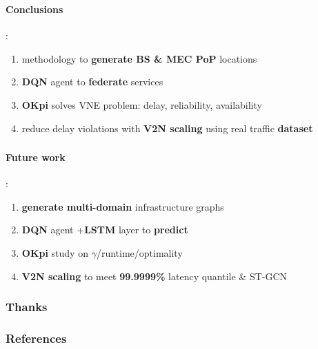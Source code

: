 \documentclass[aspectratio=169]{beamer}
\begin{document}
\begin{frame}
    \frametitle{\secname}
    \framesubtitle{Conclusions}:
    \begin{enumerate}
        \item methodology to \textbf{generate BS \& MEC PoP} locations\pause
        \item \textbf{DQN} agent to \textbf{federate} services\pause
        \item \textbf{OKpi} solves VNE problem: delay, reliability, availability\pause
        \item reduce delay violations with \textbf{V2N scaling} using real traffic \textbf{dataset}
    \end{enumerate}
\end{frame}


\begin{frame}
    \frametitle{\secname}
    \framesubtitle{Future work}:
    \begin{enumerate}
        \item \textbf{generate multi-domain} infrastructure graphs\pause
        \item \textbf{DQN} agent +\textbf{LSTM} layer to \textbf{predict}\pause
        \item \textbf{OKpi} study on $\gamma$/runtime/optimality \pause
        \item \textbf{V2N scaling} to meet \textbf{99.9999\%} latency quantile \& ST-GCN
    \end{enumerate}
\end{frame}


\begin{frame}
    \frametitle{Thanks}

\end{frame}






\begin{frame}[allowframebreaks]
        \frametitle{References}
        \printbibliography[heading=none]
\end{frame}
\end{document}
